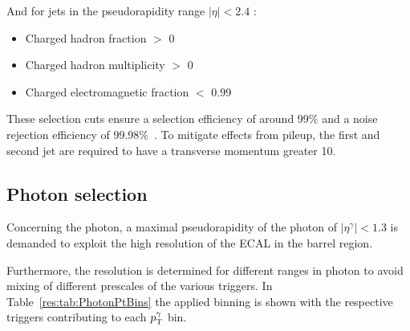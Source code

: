  And for jets in the pseudorapidity range $|\eta| < 2.4 $ :
\begin{itemize}
 \item Charged hadron fraction $>$ 0
 \item Charged hadron multiplicity $>$ 0
 \item Charged electromagnetic fraction $<$ 0.99
\end{itemize}
These selection cuts ensure a selection efficiency of around 99\% and a noise rejection efficiency of 99.98\%~\cite{bib:JetIDRecommendation_7TeV}.
To mitigate effects from pileup, the first and second jet are required to have a transverse momentum greater 10\gev.

\subsection{Photon selection}
Concerning the photon, a maximal pseudorapidity of the photon of $|\eta^{\gamma}| < 1.3$ is demanded to exploit the high resolution of the ECAL in the barrel region.

Furthermore, the resolution is determined for different ranges in photon \pt to avoid mixing of different prescales of the various triggers. 
In Table~\ref{res:tab:PhotonPtBins} the applied binning is shown with the respective triggers contributing to each $p_{\text{T}}^{\gamma}$ bin.


\renewcommand{\arraystretch}{1.5}
\begin{table}[htb]
\centering
\caption{Photon \pt bins and corresponding triggers.}
\label{res:tab:PhotonPtBins}
\end{table}

